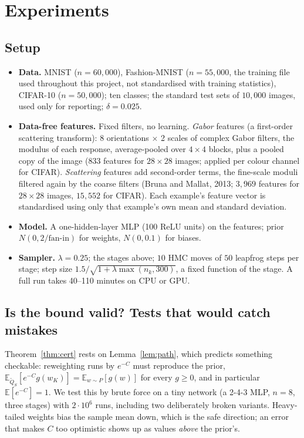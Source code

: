 \documentclass[11pt]{article}
\theoremstyle{definition}
\theoremstyle{remark}
\newcommand{\E}{\mathbb{E}}
\newcommand{\Qt}{\widetilde{Q}}
\begin{document}
\section{Experiments}\label{sec:experiments}

\subsection{Setup}
\begin{itemize}[nosep]
\item \textbf{Data.} MNIST ($n=60{,}000$), Fashion-MNIST ($n=55{,}000$, the training file used throughout this project,
  not standardised with training statistics), CIFAR-10 ($n=50{,}000$); ten classes; the standard test sets of
  $10{,}000$ images, used only for reporting; $\delta=0.025$.
\item \textbf{Data-free features.} Fixed filters, no learning. \emph{Gabor} features (a first-order scattering transform):
  8 orientations $\times$ 2 scales of complex Gabor filters, the modulus of each response, average-pooled over $4\times4$
  blocks, plus a pooled copy of the image ($833$ features for $28\times28$ images; applied per colour channel for
  CIFAR). \emph{Scattering} features add second-order terms, the fine-scale moduli filtered again by the coarse filters
  (Bruna and Mallat, 2013; $3{,}969$ features for $28\times28$ images, $15{,}552$ for CIFAR). Each example's feature
  vector is standardised using only that example's own mean and standard deviation.
\item \textbf{Model.} A one-hidden-layer MLP (100 ReLU units) on the features; prior $N(0,2/\text{fan-in})$ for weights,
  $N(0,0.1)$ for biases.
\item \textbf{Sampler.} $\lambda=0.25$; the stages above; $10$ HMC moves of $50$ leapfrog steps per stage; step size
  $1.5/\sqrt{1+\lambda\max(n_k,300)}$, a fixed function of the stage. A full run takes 40--110 minutes on CPU or GPU.
\end{itemize}

\subsection{Is the bound valid? Tests that would catch mistakes}
Theorem~\ref{thm:cert} rests on Lemma~\ref{lem:path}, which predicts something checkable: reweighting runs by $e^{-C}$ must
reproduce the prior, $\E_{\Qt_S}[e^{-C}g(w_K)]=\E_{w\sim P}[g(w)]$ for every $g\ge0$, and in particular $\E[e^{-C}]=1$. We
test this by brute force on a tiny network (a 2-4-3 MLP, $n=8$, three stages) with $2\cdot10^6$ runs, including two
deliberately broken variants. Heavy-tailed weights bias the sample mean down, which is the safe direction; an error that
makes $C$ too optimistic shows up as values \emph{above} the prior's.
\end{document}
